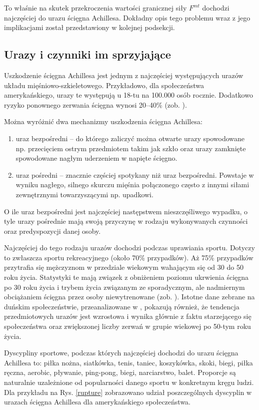 To właśnie na skutek przekroczenia wartości granicznej siły $F^{mt}$ dochodzi najczęściej do urazu ścięgna Achillesa. Dokładny opis tego problemu wraz z jego implikacjami został przedstawiony w kolejnej podsekcji.

\subsection{Urazy i czynniki im sprzyjające}

Uszkodzenie ścięgna Achillesa jest jednym z najczęściej występujących urazów układu mięśniowo-szkieletowego. Przykładowo, dla społeczeństwa amerykańskiego, urazy te występują u 18-tu na 100.000 osób rocznie. Dodatkowo ryzyko ponownego zerwania ścięgna wynosi 20--40\% (zob. \cite{EpidemiologyUS}). 

Można wyróżnić dwa mechanizmy uszkodzenia ścięgna Achillesa: 
\begin{enumerate}
	\item uraz bezpośredni -- do którego zaliczyć można otwarte urazy spowodowane np. przecięciem ostrym przedmiotem takim jak szkło oraz urazy zamknięte spowodowane nagłym uderzeniem w napięte ścięgno.
	\item uraz pośredni -- znacznie częściej spotykany niż uraz bezpośredni. Powstaje w wyniku nagłego, silnego skurczu mięśnia połączonego często z innymi siłami zewnętrznymi towarzyszącymi np. upadkowi.
\end{enumerate}
O ile uraz bezpośredni jest najczęściej następstwem nieszczęśliwego wypadku, o tyle urazy pośrednie mają swoją przyczynę w rodzaju wykonywanych czynności oraz predyspozycji danej osoby. 

Najczęściej do tego rodzaju urazów dochodzi podczas uprawiania sportu. Dotyczy to zwłaszcza sportu rekreacyjnego (około 70\% przypadków). Aż 75\% przypadków przytrafia się mężczyznom w przedziale wiekowym wahającym się od 30 do 50 roku życia. Statystyki te mają związek z obniżeniem poziomu ukrwienia ścięgna po 30 roku życia i trybem życia związanym ze sporadycznym, ale nadmiernym obciążaniem ścięgna przez osoby niewytrenowane (zob. \cite{Etiologia}). Istotne dane zebrane na duńskim społeczeństwie, przeanalizowane w \cite{Ganestam2015}, pokazują również, że tendencja przedmiotowych urazów jest wzrostowa i wynika głównie z faktu starzejącego się społeczeństwa oraz zwiększonej liczby zerwań w grupie wiekowej po 50-tym roku życia. 

Dyscypliny sportowe, podczas których najczęściej dochodzi do urazu ścięgna Achillesa to: piłka nożna, siatkówka, tenis, taniec, koszykówka, skoki, biegi, piłka ręczna, aerobic, pływanie, ping-pong, biegi, narciarstwo, balet. Proporcje są naturalnie uzależnione od popularności danego sportu w konkretnym kręgu ludzi. Dla przykładu na Rys. \ref{rupture} zobrazowano udział poszczególnych dyscyplin w urazach ścięgna Achillesa dla amerykańskiego społeczeństwa. 

